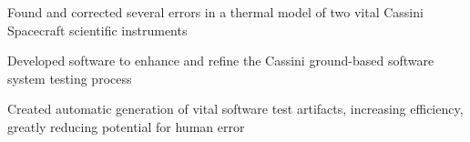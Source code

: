 \documentclass[letterpaper]{deedy-resume} %
\begin{document}
\begin{minipage}[t]{0.66\textwidth}
\begin{tightitemize}
\item Found and corrected several errors in a thermal model of two vital Cassini Spacecraft scientific instruments
\item Developed software to enhance and refine the Cassini ground-based software system testing process
\item Created automatic generation of vital software test artifacts, increasing efficiency, greatly reducing potential for human error
\end{tightitemize}








\end{minipage}
\end{document}
